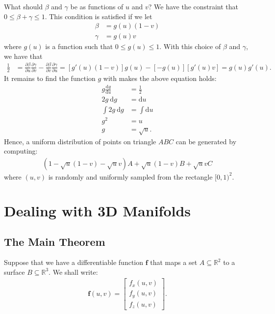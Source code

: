 \documentclass[10pt]{article}
\newcommand{\dee}{\mathrm{d}}
\newcommand{\ve}[1]{\mathbf{#1}}
\newcommand{\Real}{\mathbb{R}}
\begin{document}
  What should $\beta$ and $\gamma$ be as functions of $u$ and $v$?  We have the constraint that $0 \leq \beta + \gamma \leq 1$.  This condition is satisfied if we let
  \begin{align*}
    \beta &= g(u)(1 - v) \\
    \gamma &= g(u)v
  \end{align*}
  where $g(u)$ is a function such that $0 \leq g(u) \leq 1$.  With this choice of $\beta$ and $\gamma$, we have that
  \begin{align*}
    \frac{1}{2}
    &= \frac{\partial \beta}{\partial u} \frac{\partial \gamma}{\partial v}
    - \frac{\partial \beta}{\partial v} \frac{\partial \gamma}{\partial u} 
    = [ g'(u) (1-v) ] g(u) - [-g(u)][g'(u) v]
    = g(u)g'(u).
  \end{align*}
  It remains to find the function $g$ with makes the above equation holds:
  \begin{align*}
    g \frac{\dee g}{\dee u} &= \frac{1}{2} \\
    2g\ \dee g &= \dee u \\
    \int 2g\ \dee g &= \int \dee u \\
    g^2 &= u \\
    g &= \sqrt{u}.
  \end{align*}
  Hence, a uniform distribution of points on triangle $ABC$ can be generated by computing:
  \begin{align*}
    (1 - \sqrt{u}(1-v) - \sqrt{u}v)A + \sqrt{u}(1-v)B + \sqrt{u}v C
  \end{align*}
  where $(u,v)$ is randomly and uniformly sampled from the rectangle $[0,1)^2$.

  \section{Dealing with 3D Manifolds}
  \subsection{The Main Theorem}

  Suppose that we have a differentiable function $\ve{f}$ that maps a set $A \subseteq \Real^2$ to a surface $B \subseteq \Real^3$.  We shall write:
  \begin{align*}
    \ve{f}(u,v) = \begin{bmatrix}
      f_x(u,v) \\
      f_y(u,v) \\
      f_z(u,v)
    \end{bmatrix}.
  \end{align*}
\end{document}

